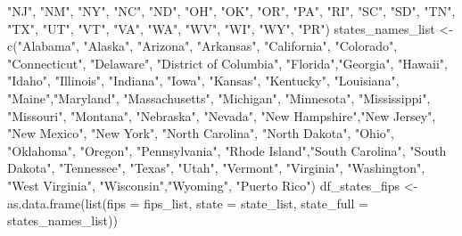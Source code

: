 \documentclass[
]{book}
\newenvironment{Shaded}{\begin{snugshade}}{\end{snugshade}}
\newcommand{\AttributeTok}[1]{\textcolor[rgb]{0.77,0.63,0.00}{#1}}
\newcommand{\FunctionTok}[1]{\textcolor[rgb]{0.00,0.00,0.00}{#1}}
\newcommand{\NormalTok}[1]{#1}
\newcommand{\OtherTok}[1]{\textcolor[rgb]{0.56,0.35,0.01}{#1}}
\newcommand{\StringTok}[1]{\textcolor[rgb]{0.31,0.60,0.02}{#1}}
\begin{document}
\begin{Shaded}
\begin{Highlighting}[]
                \StringTok{"NJ"}\NormalTok{, }\StringTok{"NM"}\NormalTok{, }\StringTok{"NY"}\NormalTok{, }\StringTok{"NC"}\NormalTok{, }\StringTok{"ND"}\NormalTok{, }\StringTok{"OH"}\NormalTok{, }\StringTok{"OK"}\NormalTok{, }\StringTok{"OR"}\NormalTok{, }\StringTok{"PA"}\NormalTok{, }\StringTok{"RI"}\NormalTok{,}
                \StringTok{"SC"}\NormalTok{, }\StringTok{"SD"}\NormalTok{, }\StringTok{"TN"}\NormalTok{, }\StringTok{"TX"}\NormalTok{, }\StringTok{"UT"}\NormalTok{, }\StringTok{"VT"}\NormalTok{, }\StringTok{"VA"}\NormalTok{, }\StringTok{"WA"}\NormalTok{, }\StringTok{"WV"}\NormalTok{, }\StringTok{"WI"}\NormalTok{,}
                \StringTok{"WY"}\NormalTok{, }\StringTok{"PR"}\NormalTok{)}
\NormalTok{states\_names\_list }\OtherTok{\textless{}{-}} \FunctionTok{c}\NormalTok{(}\StringTok{"Alabama"}\NormalTok{, }\StringTok{"Alaska"}\NormalTok{, }\StringTok{"Arizona"}\NormalTok{, }\StringTok{"Arkansas"}\NormalTok{, }\StringTok{"California"}\NormalTok{, }
                       \StringTok{"Colorado"}\NormalTok{, }\StringTok{"Connecticut"}\NormalTok{, }\StringTok{"Delaware"}\NormalTok{, }\StringTok{"District of Columbia"}\NormalTok{, }
                       \StringTok{"Florida"}\NormalTok{,}\StringTok{"Georgia"}\NormalTok{, }\StringTok{"Hawaii"}\NormalTok{, }\StringTok{"Idaho"}\NormalTok{, }\StringTok{"Illinois"}\NormalTok{, }\StringTok{"Indiana"}\NormalTok{, }
                       \StringTok{"Iowa"}\NormalTok{, }\StringTok{"Kansas"}\NormalTok{, }\StringTok{"Kentucky"}\NormalTok{, }\StringTok{"Louisiana"}\NormalTok{, }\StringTok{"Maine"}\NormalTok{,}\StringTok{"Maryland"}\NormalTok{, }
                       \StringTok{"Massachusetts"}\NormalTok{, }\StringTok{"Michigan"}\NormalTok{, }\StringTok{"Minnesota"}\NormalTok{, }\StringTok{"Mississippi"}\NormalTok{, }\StringTok{"Missouri"}\NormalTok{, }
                       \StringTok{"Montana"}\NormalTok{, }\StringTok{"Nebraska"}\NormalTok{, }\StringTok{"Nevada"}\NormalTok{, }\StringTok{"New Hampshire"}\NormalTok{,}\StringTok{"New Jersey"}\NormalTok{, }
                       \StringTok{"New Mexico"}\NormalTok{, }\StringTok{"New York"}\NormalTok{, }\StringTok{"North Carolina"}\NormalTok{, }\StringTok{"North Dakota"}\NormalTok{, }\StringTok{"Ohio"}\NormalTok{, }
                       \StringTok{"Oklahoma"}\NormalTok{, }\StringTok{"Oregon"}\NormalTok{, }\StringTok{"Pennsylvania"}\NormalTok{, }\StringTok{"Rhode Island"}\NormalTok{,}\StringTok{"South Carolina"}\NormalTok{, }
                       \StringTok{"South Dakota"}\NormalTok{, }\StringTok{"Tennessee"}\NormalTok{, }\StringTok{"Texas"}\NormalTok{, }\StringTok{"Utah"}\NormalTok{, }\StringTok{"Vermont"}\NormalTok{, }\StringTok{"Virginia"}\NormalTok{, }
                       \StringTok{"Washington"}\NormalTok{, }\StringTok{"West Virginia"}\NormalTok{, }\StringTok{"Wisconsin"}\NormalTok{,}\StringTok{"Wyoming"}\NormalTok{, }\StringTok{"Puerto Rico"}\NormalTok{)}
\NormalTok{df\_states\_fips }\OtherTok{\textless{}{-}} \FunctionTok{as.data.frame}\NormalTok{(}\FunctionTok{list}\NormalTok{(}\AttributeTok{fips =}\NormalTok{ fips\_list,}
                                     \AttributeTok{state =}\NormalTok{ state\_list,}
                                     \AttributeTok{state\_full =}\NormalTok{ states\_names\_list))}


\end{Highlighting}
\end{Shaded}
\end{document}
